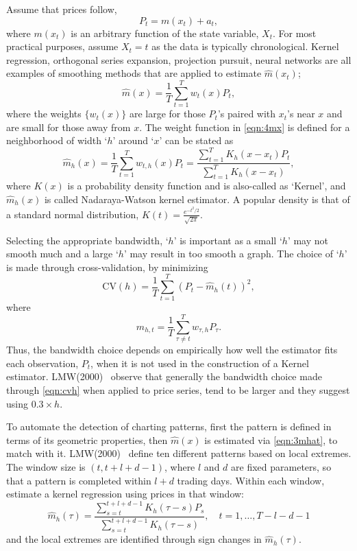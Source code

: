 Assume that prices follow,
	\begin{equation} \label{eqn:4pt}
	P_{t} = m(x_{t}) + a_{t},
	\end{equation}
where $m(x_{t})$ is an arbitrary function of the state variable, $X_{t}$. For most practical purposes, assume $X_{t}= t$ as the data is typically chronological. Kernel regression, orthogonal series expansion, projection pursuit, neural networks are all examples of smoothing methods that are applied to estimate $\hat{m}(x_{t})$;
	\begin{equation} \label{eqn:4mx}
	\hat{m}(x) = \frac{1}{T} \sum_{t=1}^Tw_{t}(x)P_{t},
	\end{equation}
where the weights $\{w_{t}(x)\}$ are large for those $P_{t}$'s paired with $x_{t}$'s near $x$ and are small for those away from $x$. The weight function in \eqref{eqn:4mx} is defined for a neighborhood of width `$h$'  around `$x$' can be stated as
	\begin{equation} \label{eqn:3mhat}
	\hat{m}_{h}(x) = \frac{1}{T}\sum_{t=1}^T w_{t,h}(x)P_{t} = \dfrac{\sum_{t=1}^T K_{h}(x-x_{t})P_{t}}{\sum_{t=1}^T K_{h}(x-x_{t})},
	\end{equation}
where $K(x)$ is a probability density function and is also-called as `Kernel', and $\hat{m}_{h}(x)$ is called Nadaraya-Watson kernel estimator. A popular density is that of a standard normal distribution, $K(t)=\frac{e^{-t^2/2}}{\sqrt{2\pi}}$.


Selecting the appropriate bandwidth, `$h$' is important as a small `$h$' may not smooth much and a large `$h$' may result in too smooth a graph. The choice of `$h$' is made through cross-validation, by minimizing
	\begin{equation} \label{eqn:cvh}
	\text{CV}(h) = \frac{1}{T}\sum_{t=1}^T (P_{t} - \hat{m}_{h}(t))^2,
	\end{equation}
where
	\begin{equation} \label{eqn:mht}
	\hat{m}_{h,t} = \frac{1}{T}\sum_{\tau\not=t}^T w_{\tau,h}P_{\tau}.
	\end{equation}
Thus, the bandwidth choice depends on empirically how well the estimator fits each observation, $P_{t}$, when it is not used in the construction of a Kernel estimator. LMW(2000)~\cite{LoMWang} observe that generally the bandwidth choice made through \eqref{eqn:cvh} when applied to price series, tend to be larger and they suggest using $0.3 \times h$.


To automate the detection of charting patterns, first the pattern is defined in terms of its geometric properties, then $\hat{m}(x)$ is estimated via \eqref{eqn:3mhat}, to match with it. LMW(2000)~\cite{LoMWang} define ten different patterns based on local extremes. The window size is $(t,t+l+d-1)$, where $l$ and $d$ are fixed parameters, so that a pattern is completed within $l+d$ trading days. Within each window, estimate  a kernel regression using prices in that window:
	\begin{equation} \label{eqn:longhat}
	\hat{m}_{h}(\tau) = \dfrac{\sum_{s = t}^{t+l+d-1}K_{h}(\tau - s)P_{s}}{\sum_{s = t}^{t+l+d-1}K_{h}(\tau - s)}, \quad t = 1,\ldots , T-l-d-1
	\end{equation}
and the local extremes are identified through sign changes in $\hat{m}_{h}(\tau)$.


